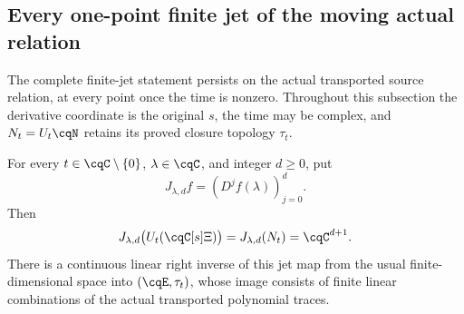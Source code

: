 \subsection{Every one-point finite jet of the moving actual relation}
\label{sec:cq-moving-finite-jets}

The complete finite-jet statement persists on the actual transported
source relation, at every point once the time is nonzero.
Throughout this subsection the derivative coordinate is the original
$s$, the time may be complex, and
$N_t=U_t\cqN$ retains its proved closure topology $\tau_t$.

\begin{cqproposition}
\label{prop:cq-moving-finite-jets}
For every $t\in\cqC\setminus\{0\}$, $\lambda\in\cqC$, and
integer $d\ge0$, put
\[
 J_{\lambda,d}f=(D^jf(\lambda))_{j=0}^d.
\]
Then
\begin{equation}
 J_{\lambda,d}\bigl(U_t(\cqC[s]\Xi)\bigr)
   =J_{\lambda,d}(N_t)=\cqC^{d+1}.
 \label{eq:cq-moving-finite-jet-image}
\end{equation}
There is a continuous linear right inverse of this jet map from
the usual finite-dimensional space into $(\cqE,\tau_t)$, whose
image consists of finite linear combinations of the actual
transported polynomial traces.
\end{cqproposition}

